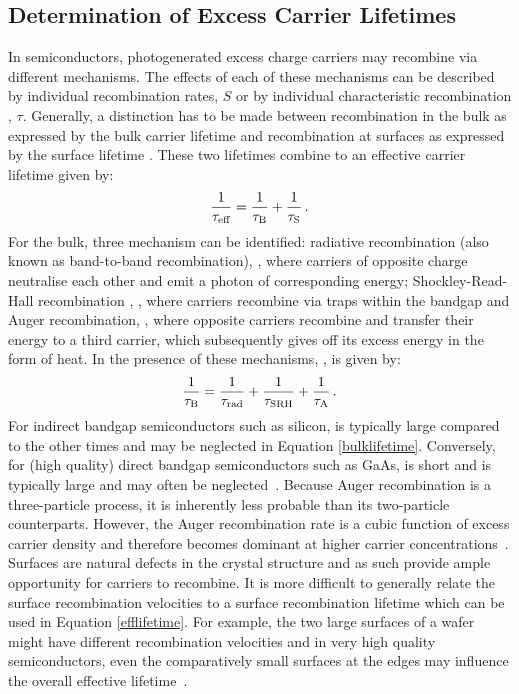 \subsection{Determination of Excess Carrier Lifetimes}
In semiconductors, photogenerated excess charge carriers may recombine via different mechanisms. The effects of each of these mechanisms can be described by individual recombination rates, $S$ or by individual characteristic recombination , $\tau$. Generally, a distinction has to be made between recombination in the bulk as expressed by the bulk carrier lifetime \tbulk{} and recombination at surfaces as expressed by the surface lifetime \tsurf{}. These two lifetimes combine to an effective carrier lifetime \teff{} given by:
\begin{equation}
\label{efflifetime}
	\frac{1}{\tau_{\text{eff}}} = \frac{1}{\tau_{\text{B}}} + \frac{1}{\tau_{\text{S}}} \, .
\end{equation}
For the bulk, three mechanism can be identified: radiative recombination (also known as band-to-band recombination), \trad{}, where carriers of opposite charge neutralise each other and emit a photon of corresponding energy; Shockley-Read-Hall recombination , \tsrh{}, where carriers recombine via traps within the bandgap and Auger recombination, \taug{}, where opposite carriers recombine and transfer their energy to a third carrier, which subsequently gives off its excess energy in the form of heat. In the presence of these mechanisms, \tbulk{}, is given by:
\begin{equation}
\label{bulklifetime}
	\frac{1}{\tau_{\text{B}}} = \frac{1}{\tau_{\text{rad}}} + \frac{1}{\tau_{\text{SRH}}} + \frac{1}{\tau_{\text{A}}} \, .
\end{equation}
For indirect bandgap semiconductors such as silicon, \trad{} is typically large compared to the other times and may be neglected in Equation \eqref{bulklifetime}. Conversely, for (high quality) direct bandgap semiconductors such as GaAs, \trad{} is short and \tsrh{} is typically large and may often be neglected~\cite{gaaslifetime}. Because Auger recombination is a three-particle process, it is inherently less probable than its two-particle counterparts. However, the Auger recombination rate is a cubic function of excess carrier density and therefore becomes dominant at higher carrier concentrations~\cite{auger}. Surfaces are natural defects in the crystal structure and as such provide ample opportunity for carriers to recombine. It is more difficult to generally relate the surface recombination velocities \ssurf{} to a surface recombination lifetime which can be used in Equation \eqref{efflifetime}. For example, the two large surfaces of a wafer might have different recombination velocities and in very high quality semiconductors, even the comparatively small surfaces at the edges may influence the overall effective lifetime~\cite{edgerecom}.\\
